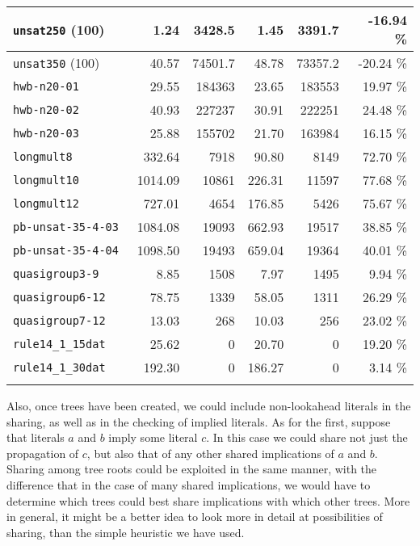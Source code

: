 \documentclass[twoside,11pt]{article}
\begin{document}
\begin{table}[h]
\begin{tabular}{|@{ $ $ }l@{ $ $ }|r@{ $ $ }|@{ $ $ }r@{ $ $ }|r@{ $ $ }| @{ $ $ }r@{ $ $ }|r@{ $ $ }|}
{\tt	unsat250} (100)	&	1.24	&	3428.5	&	1.45	&	3391.7	&	-16.94	\%	\\ \hline
{\tt	unsat350} (100)	&	40.57	&	74501.7	&	48.78	&	73357.2	&	-20.24	\%	\\ \hline
{\tt	hwb-n20-01	}&	29.55	&	184363	&	23.65	&	183553	&	19.97	\%	\\ \hline
{\tt	hwb-n20-02	}&	40.93	&	227237	&	30.91	&	222251	&	24.48	\%	\\ \hline
{\tt	hwb-n20-03	}&	25.88	&	155702	&	21.70	&	163984	&	16.15	\%	\\ \hline
{\tt	longmult8	}&	332.64	&	7918	&	90.80	&	8149	&	72.70	\%	\\ \hline
{\tt	longmult10	}&	1014.09	&	10861	&	226.31	&	11597	&	77.68	\%	\\ \hline
{\tt	longmult12	}&	727.01	&	4654	&	176.85	&	5426	&	75.67	\%	\\ \hline
{\tt	pb-unsat-35-4-03	}&	1084.08	&	19093	&	662.93	&	19517	&	38.85	\%	\\ \hline
{\tt	pb-unsat-35-4-04	}&	1098.50	&	19493	&	659.04	&	19364	&	40.01	\%	\\ \hline
{\tt	quasigroup3-9	}&	8.85	&	1508	&	7.97	&	1495	&	9.94	\%	\\ \hline
{\tt	quasigroup6-12	}&	78.75	&	1339	&	58.05	&	1311	&	26.29	\%	\\ \hline
{\tt	quasigroup7-12	}&	13.03	&	268	&	10.03	&	256	&	23.02	\%	\\ \hline
{\tt	rule14\_1\_15dat	}&	25.62	&	0	&	20.70	&	0	&	19.20	\%	\\ \hline
{\tt	rule14\_1\_30dat	}&	192.30	&	0	&	186.27	&	0	&	3.14	\%	\\ \hline


\multicolumn{1}{c}{}\\ \end{tabular}

\label{tab:tree}

\end{table}



Also, once trees have been created, we could include non-lookahead literals in the sharing, as well 
as in the checking of implied literals. As for the first, suppose that literals $a$ and $b$ imply 
some literal $c$. In this case we could share not just the propagation of $c$, but also that of 
any other shared implications of $a$ and $b$. Sharing among tree roots could be exploited in the 
same manner, with the difference that in the case of many shared implications, we would have to 
determine which trees could best share implications with which other trees. More in general, it 
might be a better idea to look more in detail at possibilities of sharing, than the simple heuristic 
we have used.
\end{document}
